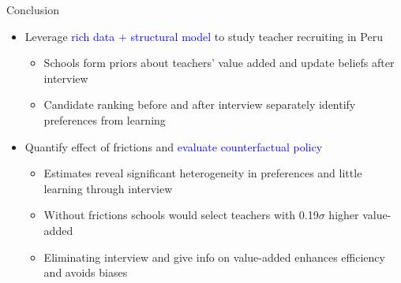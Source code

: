 \documentclass[compress,10pt,aspectratio=169]{beamer}
\newcommand\emphblue[1]{\textcolor{blue}{#1}}
\begin{document}
\begin{frame}{Conclusion}
    \begin{itemize}
        \item Leverage \emphblue{rich data + structural model} to study teacher recruiting in Peru
        \begin{itemize}
        \smallskip
            \item[$\Rightarrow$] Schools form priors about teachers' value added and update beliefs after interview
            \medskip
            \item[$\Rightarrow$] Candidate ranking before and after interview separately identify preferences from learning
        \end{itemize}
        \bigskip
        \item Quantify effect of frictions and \emphblue{evaluate counterfactual policy}
        \begin{itemize}
        \smallskip
            \item[$\Rightarrow$] Estimates reveal significant heterogeneity in preferences and little learning through interview
            \medskip
            \item[$\Rightarrow$] Without frictions schools would select teachers with 0.19$\sigma$ higher value-added
            \medskip
            \item[$\Rightarrow$] Eliminating interview and give info on value-added enhances efficiency and avoids biases
        \end{itemize}
    \end{itemize}
\end{frame}
\end{document}
